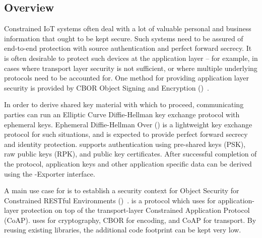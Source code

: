 



\subsection{Overview}
Constrained IoT systems often deal with a lot of valuable personal and business information that ought to be kept secure. Such systems need to be assured of end-to-end protection with source authentication and perfect forward secrecy. It is often desirable to protect such devices at the application layer -- for example, in cases where transport layer security is not sufficient, or where multiple underlying protocols need to be accounted for. One method for providing application layer security is provided by CBOR Object Signing and Encryption (\mCose)~\cite{rfc8152}.  

In order to derive shared key material with which to proceed, communicating parties can run an Elliptic Curve Diffie-Hellman key exchange protocol with ephemeral keys. Ephemeral Diffie-Hellman Over \mCose (\mEdhoc) is a lightweight key exchange protocol for such situations, and is expected to provide perfect forward secrecy and identity protection. \mEdhoc supports authentication using pre-shared keys (PSK), raw public keys (RPK), and public key certificates. After successful completion of the \mEdhoc protocol, application keys and other application specific data can be derived using the \mEdhoc-Exporter interface. 

A main use case for \mEdhoc is to establish a security context for Object Security for Constrained RESTful Environments (\mOscore)~\cite{rfc8613}. \mOscore is a protocol which uses \mCose for application-layer protection on top of the transport-layer Constrained Application Protocol (CoAP). \mEdhoc uses \mCose for cryptography, CBOR for encoding, and CoAP for transport. By reusing existing libraries, the additional code footprint can be kept very low.

